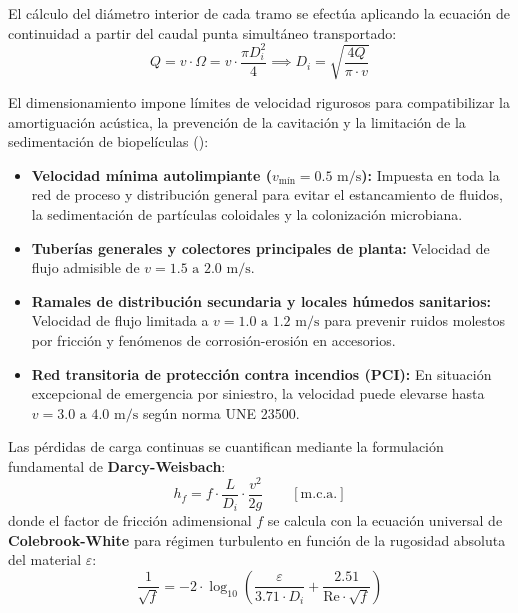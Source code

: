 \documentclass{report}
\begin{document}
El cálculo del diámetro interior de cada tramo se efectúa aplicando la ecuación de continuidad a partir del caudal punta simultáneo transportado:
\begin{equation}
    Q = v \cdot \Omega = v \cdot \frac{\pi D_i^2}{4} \implies D_i = \sqrt{\frac{4 Q}{\pi \cdot v}}
    \label{eq:continuidad_diametro}
\end{equation}

El dimensionamiento impone límites de velocidad rigurosos para compatibilizar la amortiguación acústica, la prevención de la cavitación y la limitación de la sedimentación de biopelículas (\cite{SorianoRull2012}):
\begin{itemize}
    \item \textbf{Velocidad mínima autolimpiante ($v_{\text{mín}} = 0.5\text{ m/s}$):} Impuesta en toda la red de proceso y distribución general para evitar el estancamiento de fluidos, la sedimentación de partículas coloidales y la colonización microbiana.
    \item \textbf{Tuberías generales y colectores principales de planta:} Velocidad de flujo admisible de $v = 1.5\text{ a }2.0\text{ m/s}$.
    \item \textbf{Ramales de distribución secundaria y locales húmedos sanitarios:} Velocidad de flujo limitada a $v = 1.0\text{ a }1.2\text{ m/s}$ para prevenir ruidos molestos por fricción y fenómenos de corrosión-erosión en accesorios.
    \item \textbf{Red transitoria de protección contra incendios (PCI):} En situación excepcional de emergencia por siniestro, la velocidad puede elevarse hasta $v = 3.0\text{ a }4.0\text{ m/s}$ según norma UNE 23500.
\end{itemize}

Las pérdidas de carga continuas se cuantifican mediante la formulación fundamental de \textbf{Darcy-Weisbach}:
\begin{equation}
    h_f = f \cdot \frac{L}{D_i} \cdot \frac{v^2}{2g} \qquad [\text{m.c.a.}]
    \label{eq:darcy_weisbach}
\end{equation}
donde el factor de fricción adimensional $f$ se calcula con la ecuación universal de \textbf{Colebrook-White} para régimen turbulento en función de la rugosidad absoluta del material $\varepsilon$:
\begin{equation}
    \frac{1}{\sqrt{f}} = -2 \cdot \log_{10} \left( \frac{\varepsilon}{3.71 \cdot D_i} + \frac{2.51}{\text{Re} \cdot \sqrt{f}} \right)
    \label{eq:colebrook_white}
\end{equation}
\end{document}
